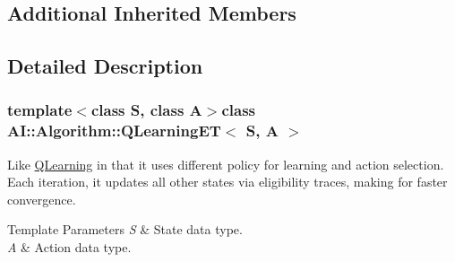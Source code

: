 \subsection*{Additional Inherited Members}


\subsection{Detailed Description}
\subsubsection*{template$<$class S, class A$>$class A\+I\+::\+Algorithm\+::\+Q\+Learning\+E\+T$<$ S, A $>$}

Like \hyperlink{classAI_1_1Algorithm_1_1QLearning}{Q\+Learning} in that it uses different policy for learning and action selection. Each iteration, it updates all other states via eligibility traces, making for faster convergence. 


\begin{DoxyTemplParams}{Template Parameters}
{\em S} & State data type. \\
\hline
{\em A} & Action data type. \\
\hline
\end{DoxyTemplParams}


